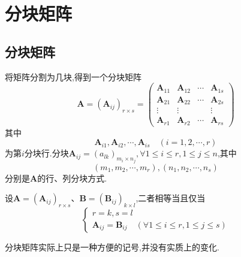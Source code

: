 \section{分块矩阵}
\subsection{分块矩阵}
\begin{formal}
\begin{definition}[分块矩阵]\label{def:分块矩阵}
    将矩阵分割为几块,得到一个分块矩阵
    \[
    \bm{A} = \left(\bm{A}_{ij}\right)_
    {r \times s} = 
    \begin{pmatrix}
        \bm{A}_{11} & \bm{A}_{12}&\cdots&\bm{A}_{1s}\\
        \bm{A}_{21} & \bm{A}_{22}&\cdots&\bm{A}_{2s}\\
        \vdots & \vdots & & \vdots\\
        \bm{A}_{r1} & \bm{A}_{r2}&\cdots&\bm{A}_{rs}
    \end{pmatrix}
    \]
其中\[
\bm{A}_{i1},\bm{A}_{i2},\cdots,\bm{A}_{is} 
\quad \left(i = 1,2,\cdots,r\right)
\]
为第$i$分块行.分块$\bm{A}_{ij}=\left(a_{lk}\right)_{m_i\times n_j},\forall 1\leqslant i\leqslant r,1\leqslant j\leqslant n$,其中
\[
\left(m_1,m_2,\cdots,m_r\right),\left(
    n_1,n_2,\cdots,n_s
\right)
\]
分别是$\bm{A}$的行、列分块方式.
\end{definition}
\end{formal}
\begin{formal}
\begin{definition}[分块矩阵的相等]\label{def:分块矩阵的相等}
    设$\bm{A} = \left(\bm{A}_{ij}\right)_{
    r \times s
}$、$\bm{B} = 
\left(\bm{B}_{ij}\right)_{
    k \times l
}$,二者相等当且仅当
\begin{equation*}
    \begin{cases*}
        r  = k,s = l  \\
        \bm{A}_{ij} =
        \bm{B}_{ij}\quad
        \left(\forall 1 \leqslant 
        i \leqslant r,1 \leqslant  j
        \leqslant s\right)
    \end{cases*}
\end{equation*}
\end{definition}
\end{formal}
\begin{red}
\begin{remark}
    分块矩阵实际上只是一种方便的记号,并没有实质上的变化.
\end{remark}
\end{red}
